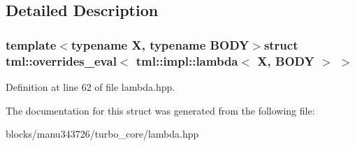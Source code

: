 \subsection{Detailed Description}
\subsubsection*{template$<$typename X, typename B\+O\+D\+Y$>$struct tml\+::overrides\+\_\+eval$<$ tml\+::impl\+::lambda$<$ X, B\+O\+D\+Y $>$ $>$}



Definition at line 62 of file lambda.\+hpp.



The documentation for this struct was generated from the following file\+:\begin{DoxyCompactItemize}
\item 
blocks/manu343726/turbo\+\_\+core/lambda.\+hpp\end{DoxyCompactItemize}
